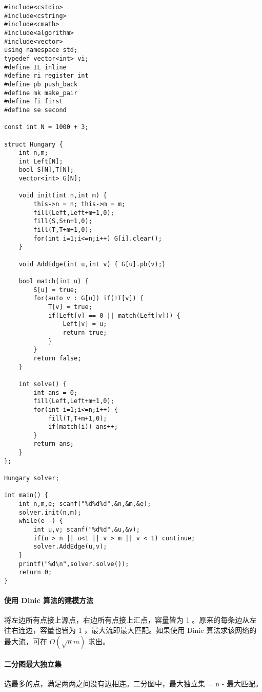 \documentclass[UTF8]{ctexart}
\begin{document}
\begin{framed}
\begin{lstlisting}
#include<cstdio>
#include<cstring>
#include<cmath>
#include<algorithm>
#include<vector>
using namespace std;
typedef vector<int> vi;
#define IL inline
#define ri register int
#define pb push_back
#define mk make_pair
#define fi first
#define se second

const int N = 1000 + 3;

struct Hungary {
    int n,m;
    int Left[N];
    bool S[N],T[N];
    vector<int> G[N];
    
    void init(int n,int m) {
        this->n = n; this->m = m;
        fill(Left,Left+m+1,0);
        fill(S,S+n+1,0);
        fill(T,T+m+1,0);
        for(int i=1;i<=n;i++) G[i].clear();
    }
    
    void AddEdge(int u,int v) { G[u].pb(v);}
    
    bool match(int u) {
        S[u] = true;
        for(auto v : G[u]) if(!T[v]) {
            T[v] = true;
            if(Left[v] == 0 || match(Left[v])) {
                Left[v] = u;
                return true;
            }
        }
        return false;
    }
    
    int solve() {
        int ans = 0;
        fill(Left,Left+m+1,0);
        for(int i=1;i<=n;i++) {
            fill(T,T+m+1,0);
            if(match(i)) ans++;
        }
        return ans;
    }
};

Hungary solver;

int main() {
    int n,m,e; scanf("%d%d%d",&n,&m,&e);
    solver.init(n,m);
    while(e--) {
        int u,v; scanf("%d%d",&u,&v);
        if(u > n || u<1 || v > m || v < 1) continue;
        solver.AddEdge(u,v);
    }
    printf("%d\n",solver.solve());
    return 0;
}
\end{lstlisting}
\end{framed}

\paragraph{使用 Dinic 算法的建模方法}
将左边所有点接上源点，右边所有点接上汇点，容量皆为 1 。原来的每条边从左往右连边，容量也皆为 1 ，最大流即最大匹配。如果使用 Dinic 算法求该网络的最大流，可在 $O(\sqrt n m)$ 求出。

\paragraph{二分图最大独立集}
选最多的点，满足两两之间没有边相连。二分图中，最大独立集 = n - 最大匹配。
\end{document}
